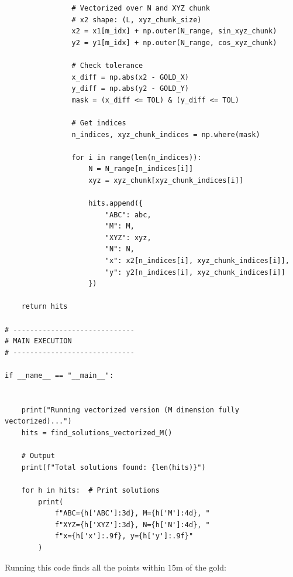 \documentclass{article}
\begin{document}
\begin{enumerate}
\begin{verbatim}
                # Vectorized over N and XYZ chunk
                # x2 shape: (L, xyz_chunk_size)
                x2 = x1[m_idx] + np.outer(N_range, sin_xyz_chunk)
                y2 = y1[m_idx] + np.outer(N_range, cos_xyz_chunk)
                
                # Check tolerance
                x_diff = np.abs(x2 - GOLD_X)
                y_diff = np.abs(y2 - GOLD_Y)
                mask = (x_diff <= TOL) & (y_diff <= TOL)
                
                # Get indices
                n_indices, xyz_chunk_indices = np.where(mask)
                
                for i in range(len(n_indices)):
                    N = N_range[n_indices[i]]
                    xyz = xyz_chunk[xyz_chunk_indices[i]]
                    
                    hits.append({
                        "ABC": abc,
                        "M": M,
                        "XYZ": xyz,
                        "N": N,
                        "x": x2[n_indices[i], xyz_chunk_indices[i]],
                        "y": y2[n_indices[i], xyz_chunk_indices[i]]
                    })
    
    return hits

# -----------------------------
# MAIN EXECUTION
# -----------------------------

if __name__ == "__main__":

    
    print("Running vectorized version (M dimension fully vectorized)...")
    hits = find_solutions_vectorized_M()
    
    # Output
    print(f"Total solutions found: {len(hits)}")
    
    for h in hits:  # Print solutions
        print(
            f"ABC={h['ABC']:3d}, M={h['M']:4d}, "
            f"XYZ={h['XYZ']:3d}, N={h['N']:4d}, "
            f"x={h['x']:.9f}, y={h['y']:.9f}"
        )

\end{verbatim}


Running this code finds all the points within $15$m of the gold:


\end{enumerate}
\end{document}
